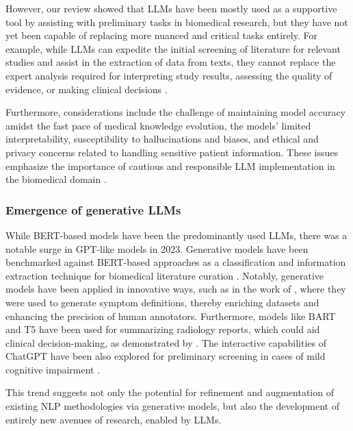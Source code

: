 \documentclass[fleqn,10pt]{olplainarticle}
\begin{document}
However, our review showed that LLMs have been mostly used as a supportive tool by assisting with preliminary tasks in biomedical research, but they have not yet been capable of replacing more nuanced and critical tasks entirely. For example, while LLMs can expedite the initial screening of literature for relevant studies and assist in the extraction of data from texts, they cannot replace the expert analysis required for interpreting study results, assessing the quality of evidence, or making clinical decisions \citep{khraisha2023can,tang2023evaluating}.

Furthermore, considerations include the challenge of maintaining model accuracy amidst the fast pace of medical knowledge evolution, the models' limited interpretability, susceptibility to hallucinations and biases, and ethical and privacy concerns related to handling sensitive patient information. These issues emphasize the importance of cautious and responsible LLM implementation in the biomedical domain \citep{ye2023cognitive,lin2023mind, thirunavukarasu2023large, wang2023decodingtrust,tian2024opportunities}.

\subsubsection*{Emergence of generative LLMs}
While BERT-based models have been the predominantly used LLMs, there was a notable surge in GPT-like models in 2023. Generative models have been benchmarked against BERT-based approaches as a classification and information extraction technique for biomedical literature curation \citep{patra2023automated, stepanov2023comparative,karkera2023leveraging}. Notably, generative models have been applied in innovative ways, such as in the work of \cite{kim2023symptomify}, where they were used to generate symptom definitions, thereby enriching datasets and enhancing the precision of human annotators. Furthermore, models like BART and T5 have been used for summarizing radiology reports, which could aid clinical decision-making, as demonstrated by \cite{wu2023knowlab}. The interactive capabilities of ChatGPT have been also explored for preliminary screening in cases of mild cognitive impairment \cite{wang2023text}. 

This trend suggests not only the potential for refinement and augmentation of existing NLP methodologies via generative models, but also the development of entirely new avenues of research, enabled by LLMs.
\end{document}
